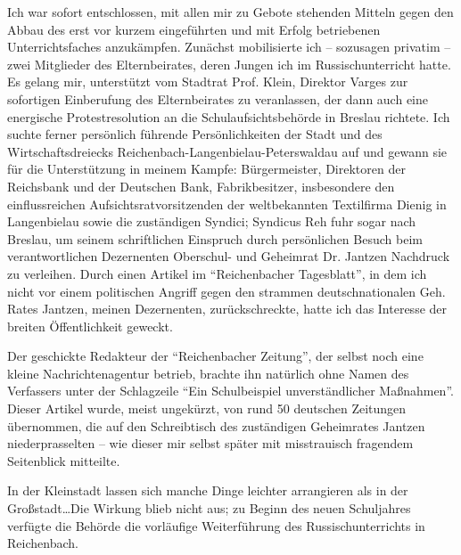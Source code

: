 Ich war sofort entschlossen, mit allen mir zu Gebote stehenden Mitteln gegen den Abbau des erst vor kurzem eingeführten und mit Erfolg betriebenen Unterrichtsfaches anzukämpfen. Zunächst mobilisierte ich -- sozusagen privatim -- zwei Mitglieder des Elternbeirates, deren Jungen ich im Russischunterricht hatte. Es gelang mir, unterstützt vom Stadtrat Prof. Klein, Direktor Varges zur sofortigen Einberufung des Elternbeirates zu veranlassen, der dann auch eine energische Protestresolution an die Schulaufsichtsbehörde in Breslau richtete. Ich suchte ferner persönlich führende Persönlichkeiten der Stadt und des Wirtschaftsdreiecks Reichenbach-Langenbielau-Peterswaldau auf und gewann sie für die Unterstützung in meinem Kampfe: Bürgermeister, Direktoren der Reichsbank und der Deutschen Bank, Fabrikbesitzer, insbesondere den einflussreichen Aufsichtsratvorsitzenden der weltbekannten Textilfirma Dienig in Langenbielau sowie die zuständigen Syndici; Syndicus Reh fuhr sogar nach Breslau, um seinem schriftlichen Einspruch durch persönlichen Besuch beim verantwortlichen Dezernenten Oberschul- und Geheimrat Dr. Jantzen Nachdruck zu verleihen. Durch einen Artikel im \enquote{Reichenbacher Tagesblatt}, in dem ich nicht vor einem politischen Angriff gegen den strammen deutschnationalen Geh. Rates Jantzen, meinen Dezernenten, zurückschreckte, hatte ich das Interesse der breiten Öffentlichkeit geweckt.

Der geschickte Redakteur der \enquote{Reichenbacher Zeitung}, der selbst noch eine kleine Nachrichtenagentur betrieb, brachte ihn natürlich ohne Namen des Verfassers unter der Schlagzeile \enquote{Ein Schulbeispiel unverständlicher Maßnahmen}. Dieser Artikel wurde, meist ungekürzt, von rund 50 deutschen Zeitungen übernommen, die auf den Schreibtisch des zuständigen Geheimrates Jantzen niederprasselten -- wie dieser mir selbst später mit misstrauisch fragendem Seitenblick mitteilte.

In der Kleinstadt lassen sich manche Dinge leichter arrangieren als in der Großstadt\dots Die Wirkung blieb nicht aus; zu Beginn des neuen Schuljahres verfügte die Behörde die vorläufige Weiterführung des Russischunterrichts in Reichenbach.

